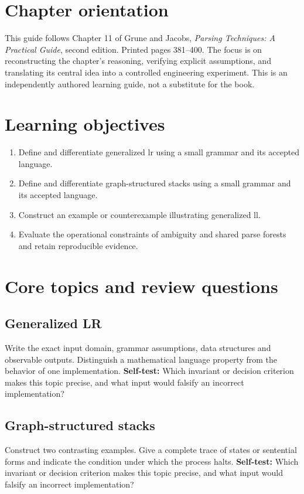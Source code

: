 \documentclass[11pt,letterpaper]{article}
\begin{document}
\makedoctitle\makedocsummary
\tableofcontents\clearpage
\section{Chapter orientation}
This guide follows Chapter 11 of Grune and Jacobs, \emph{Parsing Techniques: A Practical Guide}, second edition. Printed pages 381--400. The focus is on reconstructing the chapter's reasoning, verifying explicit assumptions, and translating its central idea into a controlled engineering experiment. This is an independently authored learning guide, not a substitute for the book.
\section{Learning objectives}
\begin{enumerate}
\item Define and differentiate generalized lr using a small grammar and its accepted language.
\item Define and differentiate graph-structured stacks using a small grammar and its accepted language.
\item Construct an example or counterexample illustrating generalized ll.
\item Evaluate the operational constraints of ambiguity and shared parse forests and retain reproducible evidence.
\end{enumerate}
\section{Core topics and review questions}
\subsection{Generalized LR}
Write the exact input domain, grammar assumptions, data structures and observable outputs. Distinguish a mathematical language property from the behavior of one implementation.
\textbf{Self-test:} Which invariant or decision criterion makes this topic precise, and what input would falsify an incorrect implementation?
\subsection{Graph-structured stacks}
Construct two contrasting examples. Give a complete trace of states or sentential forms and indicate the condition under which the process halts.
\textbf{Self-test:} Which invariant or decision criterion makes this topic precise, and what input would falsify an incorrect implementation?
\end{document}
